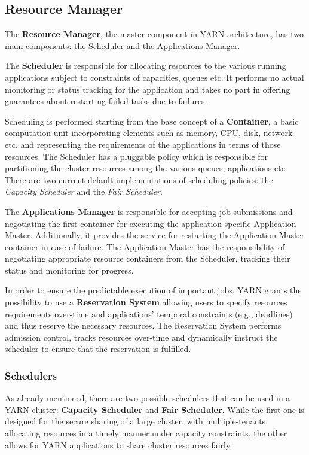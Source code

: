 \subsection{Resource Manager}

The \textbf{Resource Manager}, the master component in YARN architecture, has two main components: the Scheduler and the Applications Manager.

The \textbf{Scheduler} is responsible for allocating resources to the various running applications subject to constraints of capacities, queues etc. It performs no actual monitoring or status tracking for the application and takes no part in offering guarantees about restarting failed tasks due to failures. 

Scheduling is performed starting from the base concept of a \textbf{Container}, a basic computation unit incorporating elements such as memory, CPU, disk, network etc. and representing the requirements of the applications in terms of those resources. The Scheduler has a pluggable policy which is responsible for partitioning the cluster resources among the various queues, applications etc. There are two current default implementations of scheduling policies: the \textit{Capacity Scheduler} and the \textit{Fair Scheduler}.

The \textbf{Applications Manager} is responsible for accepting job-submissions and negotiating the first container for executing the application specific Application Master. Additionally, it provides the service for restarting the Application Master container in case of failure. The Application Master has the responsibility of negotiating appropriate resource containers from the Scheduler, tracking their status and monitoring for progress.

In order to ensure the predictable execution of important jobs, YARN grants the possibility to use a \textbf{Reservation System} allowing users to specify resources requirements over-time and applications' temporal constraints (e.g., deadlines) and thus reserve the necessary resources. The Reservation System  performs admission control, tracks resources over-time and dynamically instruct the scheduler to ensure that the reservation is fulfilled.

\subsubsection{Schedulers}

As already mentioned, there are two possible schedulers that can be used in a YARN cluster: \textbf{Capacity Scheduler} and \textbf{Fair Scheduler}. While the first one is designed for the secure sharing of a large cluster, with multiple-tenants, allocating resources in a timely manner under capacity constraints, the other allows for YARN applications to share cluster resources fairly.

